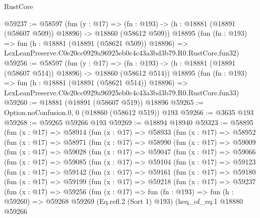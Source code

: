 \begin{lexlean}{RustCore}
\begin{coremodule}
@59237 := @58597
    (fun (y : @17) =>
    (fn : @193) -> (h : @18881 (@18891 (@58607 @509)) @18896) -> @18860 (@58612 @509))
    @18895
    (fun (fn : @193) =>
    fun (h : @18881 (@18891 (@58621 @509)) @18896) =>
    LexLeanPreserve.C0e20cc0929a96925eb0c4c43a3bd3b79.R0.RustCore.fun32)
@59256 := @58597
    (fun (y : @17) =>
    (fn : @193) -> (h : @18881 (@18891 (@58607 @514)) @18896) -> @18860 (@58612 @514))
    @18895
    (fun (fn : @193) =>
    fun (h : @18881 (@18891 (@58621 @514)) @18896) =>
    LexLeanPreserve.C0e20cc0929a96925eb0c4c43a3bd3b79.R0.RustCore.fun33)
@59260 := @18881 (@18891 (@58607 @519)) @18896
@59265 := Option.noConfusion.{0, 0} (@18860 (@58612 @519)) @193
@59266 := @3635 @193
@59268 := @59265 @59266 @193
@59269 := @18894 @18940
@59323 := @58895
    (fun (x : @17) =>
    @58914
      (fun (x : @17) =>
      @58933
        (fun (x : @17) =>
        @58952
          (fun (x : @17) =>
          @58971
            (fun (x : @17) =>
            @58990
              (fun (x : @17) =>
              @59009
                (fun (x : @17) =>
                @59028
                  (fun (x : @17) =>
                  @59047
                    (fun (x : @17) =>
                    @59066
                      (fun (x : @17) =>
                      @59085
                        (fun (x : @17) =>
                        @59104
                          (fun (x : @17) =>
                          @59123
                            (fun (x : @17) =>
                            @59142
                              (fun (x : @17) =>
                              @59161
                                (fun (x : @17) =>
                                @59180
                                  (fun (x : @17) =>
                                  @59199
                                    (fun (x : @17) =>
                                    @59218
                                      (fun (x : @17) =>
                                      @59237
                                        (fun (x : @17) =>
                                        @59256
                                          (fun (x : @17) =>
                                          fun (fn : @193) =>
                                          fun (h : @59260) =>
                                          @59268
                                            @59269
                                            (Eq.refl.{2} (Sort 1) @193)
                                            (heq_of_eq.{1}
                                              @18880
                                              @59266

\end{coremodule}
\end{lexlean}
